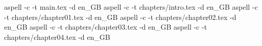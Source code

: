 aspell -c -t main.tex -d en_GB
aspell -c -t chapters/intro.tex -d en_GB
aspell -c -t chapters/chapter01.tex -d en_GB
aspell -c -t chapters/chapter02.tex -d en_GB
aspell -c -t chapters/chapter03.tex -d en_GB
aspell -c -t chapters/chapter04.tex -d en_GB
